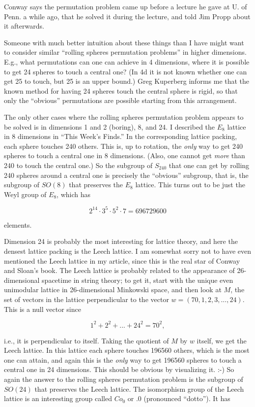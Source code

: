 \documentclass{article}
\begin{document}
Conway says the permutation problem came up before a lecture he gave at
U. of Penn. a while ago, that he solved it during the lecture, and told
Jim Propp about it afterwards.

Someone with much better intuition about these things than I have might
want to consider similar ``rolling spheres permutation problems'' in
higher dimensions. E.g., what permutations can one can achieve in 4
dimensions, where it is possible to get 24 spheres to touch a central
one? (In 4d it is not known whether one can get 25 to touch, but 25 is
an upper bound.) Greg Kuperberg informs me that the known method for
having 24 spheres touch the central sphere is rigid, so that only the
``obvious'' permutations are possible starting from this arrangement.

The only other cases where the rolling spheres permutation problem
appears to be solved is in dimensions 1 and 2 (boring), 8, and 24. I
described the \(E_8\) lattice in 8 dimensions in ``This Week's Finds.''
In the corresponding lattice packing, each sphere touches 240 others.
This is, up to rotation, the \emph{only} way to get 240 spheres to touch
a central one in 8 dimensions. (Also, one cannot get \emph{more} than
240 to touch the central one.) So the subgroup of \(S_{240}\) that one
can get by rolling 240 spheres around a central one is precisely the
``obvious'' subgroup, that is, the subgroup of \(SO(8)\) that preserves
the \(E_8\) lattice. This turns out to be just the Weyl group of
\(E_8\), which has

\[2^{14}\cdot 3^5\cdot 5^2\cdot 7 = 696729600\]

elements.

Dimension 24 is probably the most interesting for lattice theory, and
here the densest lattice packing is the Leech lattice. I am somewhat
sorry not to have even mentioned the Leech lattice in my article, since
this is the real star of Conway and Sloan's book. The Leech lattice is
probably related to the appearance of 26-dimensional spacetime in string
theory; to get it, start with the unique even unimodular lattice in
26-dimensional Minkowski space, and then look at \(M\), the set of
vectors in the lattice perpendicular to the vector
\(w = (70,1,2,3,...,24)\). This is a null vector since

\[1^2 + 2^2 + ... + 24^2 = 70^2,\]

i.e., it is perpendicular to itself. Taking the quotient of \(M\) by
\(w\) itself, we get the Leech lattice. In this lattice each sphere
touches 196560 others, which is the most one can attain, and again this
is the \emph{only} way to get 196560 spheres to touch a central one in
24 dimensions. This should be obvious by visualizing it. :-) So again
the answer to the rolling spheres permutation problem is the subgroup of
\(SO(24)\) that preserves the Leech lattice. The isomorphism group of
the Leech lattice is an interesting group called \(Co_0\) or \(.0\)
(pronounced ``dotto''). It has
\end{document}
